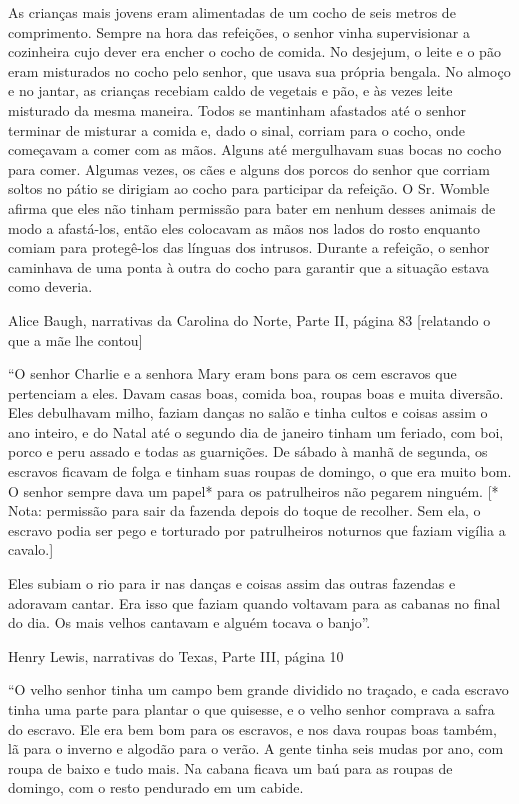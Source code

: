 As crianças mais jovens eram alimentadas de um cocho de seis metros de
comprimento. Sempre na hora das refeições, o senhor vinha supervisionar
a cozinheira cujo dever era encher o cocho de comida. No desjejum, o
leite e o pão eram misturados no cocho pelo senhor, que usava sua
própria bengala. No almoço e no jantar, as crianças recebiam caldo de
vegetais e pão, e às vezes leite misturado da mesma maneira. Todos se
mantinham afastados até o senhor terminar de misturar a comida e, dado o
sinal, corriam para o cocho, onde começavam a comer com as mãos. Alguns
até mergulhavam suas bocas no cocho para comer. Algumas vezes, os cães e
alguns dos porcos do senhor que corriam soltos no pátio se dirigiam ao
cocho para participar da refeição. O Sr. Womble afirma que eles não
tinham permissão para bater em nenhum desses animais de modo a
afastá-los, então eles colocavam as mãos nos lados do rosto enquanto
comiam para protegê-los das línguas dos intrusos. Durante a refeição, o
senhor caminhava de uma ponta à outra do cocho para garantir que a
situação estava como deveria.

Alice Baugh, narrativas da Carolina do Norte, Parte II, página 83
{[}relatando o que a mãe lhe contou{]}

``O senhor Charlie e a senhora Mary eram bons para os cem escravos que
pertenciam a eles. Davam casas boas, comida boa, roupas boas e muita
diversão. Eles debulhavam milho, faziam danças no salão e tinha cultos e
coisas assim o ano inteiro, e do Natal até o segundo dia de janeiro
tinham um feriado, com boi, porco e peru assado e todas as guarnições.
De sábado à manhã de segunda, os escravos ficavam de folga e tinham suas
roupas de domingo, o que era muito bom. O senhor sempre dava um papel*
para os patrulheiros não pegarem ninguém. {[}* Nota: permissão para sair
da fazenda depois do toque de recolher. Sem ela, o escravo podia ser
pego e torturado por patrulheiros noturnos que faziam vigília a
cavalo.{]}

Eles subiam o rio para ir nas danças e coisas assim das outras fazendas
e adoravam cantar. Era isso que faziam quando voltavam para as cabanas
no final do dia. Os mais velhos cantavam e alguém tocava o banjo''.

Henry Lewis, narrativas do Texas, Parte III, página 10

``O velho senhor tinha um campo bem grande dividido no traçado, e cada
escravo tinha uma parte para plantar o que quisesse, e o velho senhor
comprava a safra do escravo. Ele era bem bom para os escravos, e nos
dava roupas boas também, lã para o inverno e algodão para o verão. A
gente tinha seis mudas por ano, com roupa de baixo e tudo mais. Na
cabana ficava um baú para as roupas de domingo, com o resto pendurado em
um cabide.

